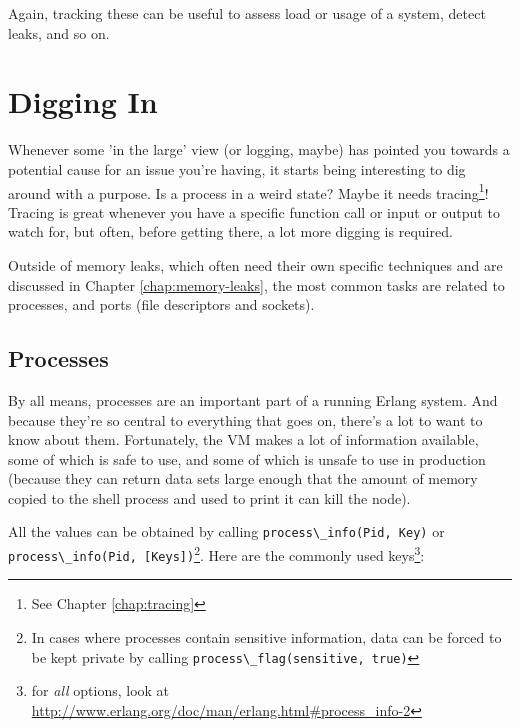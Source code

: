 \documentclass[11pt, oneside]{book}   	%
\newcommand{\expression}[1]{\Verb`#1`}
\begin{document}
Again, tracking these can be useful to assess load or usage of a system, detect leaks, and so on.

\section{Digging In}
\label{sec:digging-in}

Whenever some 'in the large' view (or logging, maybe) has pointed you towards a potential cause for an issue you're having, it starts being interesting to dig around with a purpose. Is a process in a weird state? Maybe it needs tracing\footnote{See Chapter \ref{chap:tracing}}! Tracing is great whenever you have a specific function call or input or output to watch for, but often, before getting there, a lot more digging is required.

Outside of memory leaks, which often need their own specific techniques and are discussed in Chapter \ref{chap:memory-leaks}, the most common tasks are related to processes, and ports (file descriptors and sockets).

\subsection{Processes}
\label{subsec:digging-procs}

By all means, processes are an important part of a running Erlang system. And because they're so central to everything that goes on, there's a lot to want to know about them. Fortunately, the VM makes a lot of information available, some of which is safe to use, and some of which is unsafe to use in production (because they can return data sets large enough that the amount of memory copied to the shell process and used to print it can kill the node).

All the values can be obtained by calling \expression{process\_info(Pid, Key)} or \newline \expression{process\_info(Pid, [Keys])}\footnote{In cases where processes contain sensitive information, data can be forced to be kept private by calling \expression{process\_flag(sensitive, true)}}. Here are the commonly used keys\footnote{for \emph{all} options, look at \href{http://www.erlang.org/doc/man/erlang.html\#process\_info-2}{http://www.erlang.org/doc/man/erlang.html\#process\_info-2}}:
\end{document}
